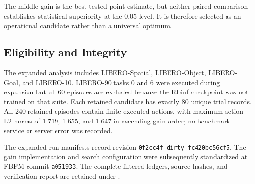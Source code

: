 \begin{table}[H]
    \centering
    \small
    \setlength{\tabcolsep}{6pt}
    \caption{Task-level outcomes for the three expanded $k_p$ candidates.}
    \label{tab:dreamzero-kp-expanded}
\end{table}

The middle gain is the best tested point estimate, but neither paired
comparison establishes statistical superiority at the 0.05 level. It is
therefore selected as an operational candidate rather than a universal optimum.

\subsection{Eligibility and Integrity}

The expanded analysis includes LIBERO-Spatial, LIBERO-Object, LIBERO-Goal, and
LIBERO-10. LIBERO-90 tasks 0 and 6 were executed during expansion but all 60
episodes are excluded because the RLinf checkpoint was not trained on that
suite. Each retained candidate has exactly 80 unique trial records. All 240
retained episodes contain finite executed actions, with maximum action L2 norms
of 1.719, 1.655, and 1.647 in ascending gain order; no benchmark-service or
server error was recorded.

The expanded run manifests record revision
\texttt{0f2cc4f-dirty-fc420bc56cf5}. The gain implementation and search
configuration were subsequently standardized at FBFM commit
\texttt{a051933}. The complete filtered
ledgers, source hashes, and verification report are retained under
.
